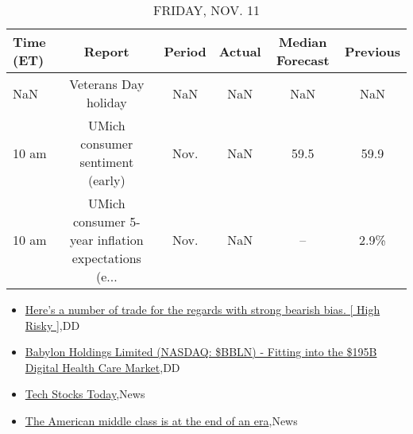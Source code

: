 \documentclass{article}%
\begin{document}
%


\begin{table}[htbp]%
\caption{FRIDAY, NOV. 11}%
\centering%
\begin{adjustbox}{width=1\textwidth}%
\begin{tabular}{lccccc}
\toprule
Time (ET) &                                             Report & Period & Actual & Median Forecast & Previous \\
\midrule
      NaN &                               Veterans Day holiday &    NaN &    NaN &             NaN &      NaN \\
    10 am &                   UMich consumer sentiment (early) &   Nov. &    NaN &            59.5 &     59.9 \\
    10 am & UMich consumer 5-year inflation expectations (e... &   Nov. &    NaN &              -- &     2.9\% \\
\bottomrule
\end{tabular}
%
\end{adjustbox}%
\end{table}

%
\begin{itemize}%
\item%
\href{https://reddit.com/r/wallstreetbets/comments/ys87iz/heres\_a\_number\_of\_trade\_for\_the\_regards\_with/}{Here's a number of trade for the regards with strong bearish bias. [ High Risky ]},DD%
\item%
\href{https://reddit.com/r/Baystreetbets/comments/yrg7y3/babylon\_holdings\_limited\_nasdaq\_bbln\_fitting\_into/}{Babylon Holdings Limited (NASDAQ: \$BBLN) - Fitting into the \$195B Digital Health Care Market},DD%
\item%
\href{https://reddit.com/r/StockMarket/comments/ys3m4t/tech\_stocks\_today/}{Tech Stocks Today},News%
\item%
\href{https://reddit.com/r/Economics/comments/ys482s/the\_american\_middle\_class\_is\_at\_the\_end\_of\_an\_era/}{The American middle class is at the end of an era},News%
\end{itemize}%
\end{document}
